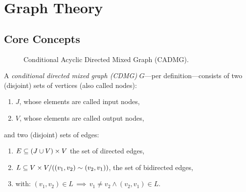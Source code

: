 \section{Graph Theory}

\subsection{Core Concepts}

\begin{figure}[ht]
\centering
{}
\caption{Conditional Acyclic Directed Mixed Graph (CADMG).}
\label{fig:cadmg}
\end{figure}


\begin{defmark}
\begin{Def}
    \label{def-cdmg}
    A \emph{conditional directed mixed graph (CDMG)} $G$---per definition---consists of two (disjoint) sets of
    vertices (also called nodes):
    \begin{enumerate}[label=\roman*.)]
        \item $J$, whose elements are called input nodes,
        \item $V$, whose elements are called output nodes,
    \end{enumerate}
    and two (disjoint) sets of edges:
    \begin{enumerate}[resume,label=\roman*.)]
        \item $E \subseteq (J \cup V) \times V$ the set of directed edges,
        \item $L \subseteq V \times V/((v_1,v_2) \sim (v_2,v_1)) $, the set of bidirected edges, 
        \item[]    with: $(v_1,v_2) \in L \, \implies\, v_1\neq v_2 \land (v_2,v_1) \in L$.
    \end{enumerate}
\end{Def}
\end{defmark}

